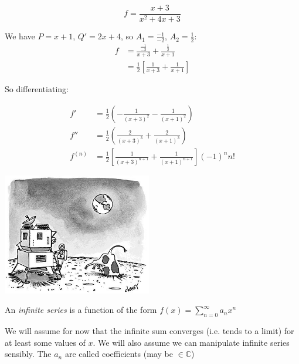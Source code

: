 \documentclass[10pt]{scrartcl}
\begin{document}
\begin{example}
\[f = \frac{x+3}{x^2 + 4x + 3}\]

We have $P = x+1$, $Q'=  2x+4$, so $A_1 = \frac{-1}{-2}$, $A_2 = \frac{1}{2}$: 
	\[
\begin{aligned}
 f &= \frac{\frac{-1}{-2}}{x+3} + \frac{\frac{1}{2}}{x+1}\\
  &= \frac{1}{2}\left[\frac{1}{x+3} + \frac{1}{x+1}\right]
\end{aligned}
\]

So differentiating: 

\[
\begin{aligned}
  f' &= \frac{1}{2}\left(-\frac{1}{(x+3)^2} - \frac{1}{(x+1)^2}\right)\\
  f'' &= \frac{1}{2}\left(\frac{2}{(x+3)^3} + \frac{2}{(x+1)^3}\right)\\
  f^{(n)} &= \frac{1}{2}\left[\frac{1}{(x+3)^{n+1}} + \frac{1}{(x+1)^{n+1}}\right](-1)^nn!
\end{aligned}
\]
\end{example}


\vspace*{1cm}

\begin{center}
\includegraphics[width = 6.5cm]{cartoon3.jpg}	
\end{center}






\vspace*{5pt}

\begin{definition}An \emph{infinite series} is a  function of the form $f(x) = \sum_{n=0}^{\infty} a_n x^n$\end{definition}

We will assume for now that the infinite sum converges (i.e. tends to a limit) for at least some values of $x$. We will also assume we can manipulate infinite series sensibly. The $a_n$ are called coefficients (may be $\in \mathbb{C}$)
\end{document}
